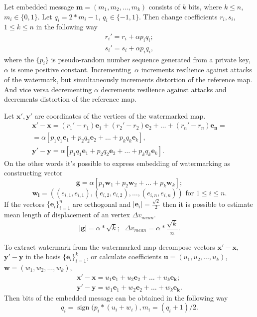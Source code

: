 \documentclass{article}
\newcommand{\sgn}{\operatorname{sign}}
\begin{document}
Let embedded message $\mathbf{m} = (m_1, m_2, \dots, m_k)$ consists of $k$ bits, where $k \le n$, $m_i \in \{0, 1\}$. Let $q_i = 2 * m_i - 1$, $q_i \in \{-1, 1\}$.
Then change coefficients $r_i, s_i$, $1 \le k \le n$ in the following way
\begin{eqnarray*}
  r_i' = r_i + \alpha p_i q_i; \\
  s_i' = s_i + \alpha p_i q_i, 
\end{eqnarray*}
where the $\{p_i\}$ is pseudo-random number sequence generated from a private key, $\alpha$ is some positive constant. Incrementing~$\alpha$ increments resilience against attacks of the watermark, 
but simultaneously increments distortion of the reference map. And vice versa decrementing $\alpha$ decrements resilience against attacks and decrements distortion of the reference map.

Let $\mathbf{x'}, \mathbf{y'}$ are coordinates of the vertices of the watermarked map. 
\begin{eqnarray*}
  \mathbf{x'} - \mathbf{x} = (r_1' - r_1) \mathbf{e}_1 + (r_2' - r_2) \mathbf{e}_2 + \dots + (r_n' - r_n) \mathbf{e_n} = \\
  = \alpha \left[ p_1 q_1 \mathbf{e}_1 + p_2 q_2 \mathbf{e}_2 + \dots + p_k q_k \mathbf{e}_k \right], \\
  \mathbf{y'} - \mathbf{y} = \alpha \left[ p_1 q_1 \mathbf{e}_1 + p_2 q_2 \mathbf{e}_2 + \dots + p_k q_k \mathbf{e}_k \right]. 
\end{eqnarray*}
On the other words it's possible to express embedding of watermarking as constructing vector 
\begin{equation}
\label{formula:g}
 \mathbf{g} = \alpha \left[ p_1 \mathbf{w}_1 + p_2 \mathbf{w}_2 + \dots + p_k \mathbf{w}_k \right]; 
\end{equation}
$$ \mathbf{w_i} = \left( (e_{i, 1}, e_{i, 1}), (e_{i, 2}, e_{i, 2}), \dots, (e_{i, n}, e_{i, n}) \right) \mbox{ for } 1 \le i \le n. $$
If the vectors $\{\mathbf{e}_i\}_{i=1}^n$ are orthogonal and $|\mathbf{e}_i| = \frac{\sqrt{2}}{2}$ then it is possible to estimate mean length of displacement of an vertex $\Delta v_{mean}$.
\begin{equation}
\label{formula:mean_displacement}
|\mathbf{g}| = \alpha * \sqrt {k}; \mbox{      } \Delta v_{mean} = \alpha * \frac{\sqrt{k}}{n}. 
\end{equation}

To extract watermark from the watermarked map decompose vectors $\mathbf{x'} - \mathbf{x}$, $\mathbf{y'} - \mathbf{y}$ in the basis $\{\mathbf{e}_i\}_{i=1}^k$, or calculate coefficients 
$\mathbf{u} = (u_1, u_2, \dots, u_k)$, $\mathbf{w} = (w_1, w_2, \dots, w_k)$, 
\begin{eqnarray*}
  \mathbf{x'} - \mathbf{x} = u_1 \mathbf{e}_1 + u_2 \mathbf{e}_2 + \dots + u_k \mathbf{e_k}; \\ 
  \mathbf{y'} - \mathbf{y} = w_1 \mathbf{e}_1 + w_2 \mathbf{e}_2 + \dots + w_k \mathbf{e_k}.  
\end{eqnarray*}
Then bits of the embedded message can be obtained in the following way
$$q_i = \sgn(p_i * (u_i + w_i), m_i = (q_i + 1) / 2.$$
\end{document}
